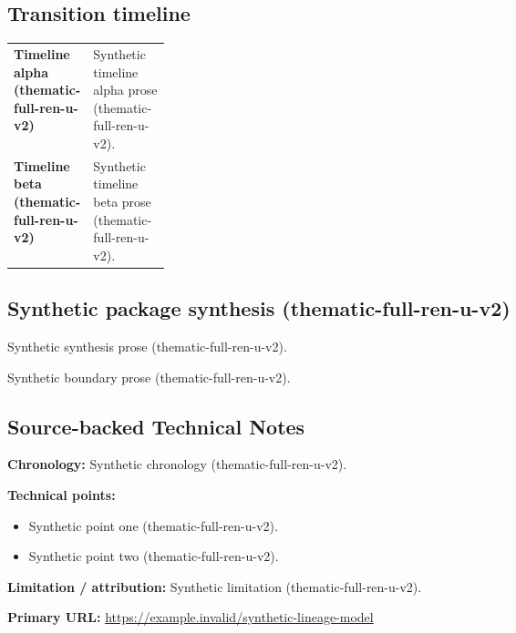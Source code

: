 \documentclass[lualatex,a4paper,10pt]{jlreq}
\begin{document}
\medskip
\begin{wideflow}
\subsection*{Transition timeline}
\begin{tabularx}{\linewidth}{@{}>{\bfseries}p{0.20\linewidth}X@{}}
Timeline alpha (thematic-full-ren-u-v2) & Synthetic timeline alpha prose (thematic-full-ren-u-v2). \cite{sp001lnd001} \\
Timeline beta (thematic-full-ren-u-v2) & Synthetic timeline beta prose (thematic-full-ren-u-v2). \cite{sp001lnd001} \\
\end{tabularx}
\end{wideflow}
\medskip
\begin{multicols}{2}
\subsection*{Synthetic package synthesis (thematic-full-ren-u-v2)}
\noindent Synthetic synthesis prose (thematic-full-ren-u-v2). \cite{sp001lnd001}\par\medskip
\end{multicols}
\medskip
\begin{claimboundary}
\noindent Synthetic boundary prose (thematic-full-ren-u-v2). \cite{sp001lnd001}\par
\end{claimboundary}
\medskip
\subsection*{Source-backed Technical Notes}
\begin{technicalnote}
\noindent\textbf{Chronology:} Synthetic chronology (thematic-full-ren-u-v2). \cite{sp001lnd001}\par
\smallskip\noindent\textbf{Technical points:}\par
\begin{itemize}
\item Synthetic point one (thematic-full-ren-u-v2). \cite{sp001lnd001}
\item Synthetic point two (thematic-full-ren-u-v2). \cite{sp001lnd001}
\end{itemize}
\noindent\textbf{Limitation / attribution:} Synthetic limitation (thematic-full-ren-u-v2).\par
\smallskip\noindent\textbf{Primary URL:} \url{https://example.invalid/synthetic-lineage-model}\par
\end{technicalnote}
\smallskip
\Needspace{0.30\textheight}
\end{document}
